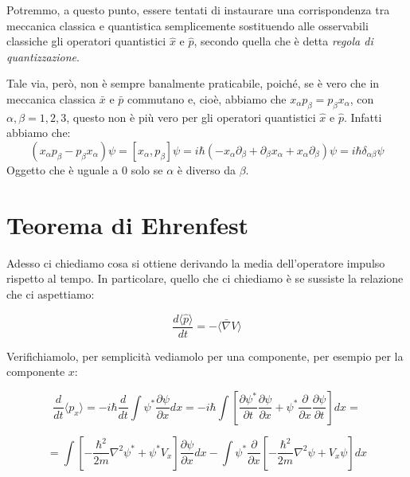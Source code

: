 Potremmo, a questo punto, essere tentati di instaurare una corrispondenza tra meccanica classica e quantistica semplicemente sostituendo alle osservabili classiche gli operatori quantistici $\hat x$ e $\hat p$, secondo quella che è detta \emph{regola di quantizzazione}.

Tale via, però, non è sempre banalmente praticabile, poiché, se è vero che in meccanica classica $\bar x$ e $\bar p$ commutano e, cioè, abbiamo che $x_\alpha  p_\beta = p_\beta x_\alpha$, con $\alpha,\beta =1,2,3$, questo non è più vero per gli operatori quantistici $\hat x$ e $\hat p$. Infatti abbiamo che:
\begin{equation}
(x_\alpha p_{\beta} -  p_{\beta} x_{\alpha})\psi = \left[x_\alpha,p_\beta\right]\psi = i\hbar(-x_\alpha\partial_\beta+\partial_\beta x_\alpha+x_\alpha\partial_\beta)\psi=i\hbar\delta_{\alpha \beta} \psi
\end{equation}
Oggetto che è uguale a 0 solo se $\alpha$ è diverso da  $\beta$.

\section{Teorema di Ehrenfest} %
Adesso ci chiediamo cosa si ottiene derivando la media dell'operatore impulso rispetto al tempo. In particolare, quello che ci chiediamo è se sussiste la relazione che ci aspettiamo:

\begin{equation} \label{Ehre0}
\frac{d\langle \hat p\rangle}{dt}=-\langle \bar \nabla V\rangle
\end{equation}

Verifichiamolo, per semplicità vediamolo per una componente, per esempio per la componente $x$:

\begin{equation} \label{Ehre1}
\frac{d}{dt} \langle p_x \rangle = -i\hbar\frac{d}{dt}
\int{\psi^*\frac{\partial \psi}{\partial x} dx} = -i\hbar \int{\left[\frac{\partial\psi^*}{\partial t}\frac{\partial\psi}{\partial x}+\psi^*\frac{\partial}{\partial x}\frac{\partial\psi}{\partial t}\right]dx}=
\end{equation}

\begin{equation} \label{Ehre2}
=\int{\left[-\frac{\hbar^2}{2m}\nabla^2\psi^*+\psi^*V_x\right]\frac{\partial\psi}{\partial x}dx}-\int{\psi^*\frac{\partial}{\partial x}\left[-\frac{\hbar^2}{2m}\nabla^2\psi+V_x\psi\right]dx}
\end{equation}

